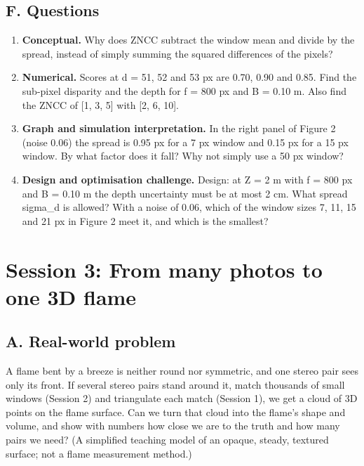 \documentclass[11pt,a4paper]{article}
\begin{document}
\subsection*{F. Questions}
\begin{enumerate}[nosep]
\item \textbf{Conceptual.} Why does ZNCC subtract the window mean and divide by the spread, instead of simply summing the squared differences of the pixels?
\item \textbf{Numerical.} Scores at d = 51, 52 and 53 px are 0.70, 0.90 and 0.85. Find the sub-pixel disparity and the depth for f = 800 px and B = 0.10 m. Also find the ZNCC of [1, 3, 5] with [2, 6, 10].
\item \textbf{Graph and simulation interpretation.} In the right panel of Figure 2 (noise 0.06) the spread is 0.95 px for a 7 px window and 0.15 px for a 15 px window. By what factor does it fall? Why not simply use a 50 px window?
\item \textbf{Design and optimisation challenge.} Design: at Z = 2 m with f = 800 px and B = 0.10 m the depth uncertainty must be at most 2 cm. What spread sigma\_d is allowed? With a noise of 0.06, which of the window sizes 7, 11, 15 and 21 px in Figure 2 meet it, and which is the smallest?
\end{enumerate}

\section{Session 3: From many photos to one 3D flame}

\subsection*{A. Real-world problem}
A flame bent by a breeze is neither round nor symmetric, and one stereo pair sees only its front. If several stereo pairs stand around it, match thousands of small windows (Session 2) and triangulate each match (Session 1), we get a cloud of 3D points on the flame surface. Can we turn that cloud into the flame's shape and volume, and show with numbers how close we are to the truth and how many pairs we need? (A simplified teaching model of an opaque, steady, textured surface; not a flame measurement method.)
\end{document}
